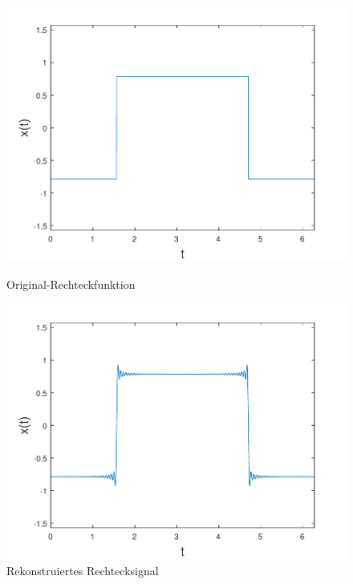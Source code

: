 \begin{refsection}
\begin{figure}
\begin{minipage}[hbt]{0.5\textwidth}
\centering
\includegraphics[width=1\textwidth]{kugel/Gibbs/Funktion.pdf}
\caption{Original-Rechteckfunktion}
\label{skript:Gibborg}
\end{minipage}
\hfill
\begin{minipage}[hbt]{0.5\textwidth}
\centering
\includegraphics[width=1\textwidth]{kugel/Gibbs/Gibbs.pdf}
\caption{Rekonstruiertes Rechtecksignal}
\label{skript:Gibbsre}
\end{minipage}
\end{figure}


\end{refsection}
